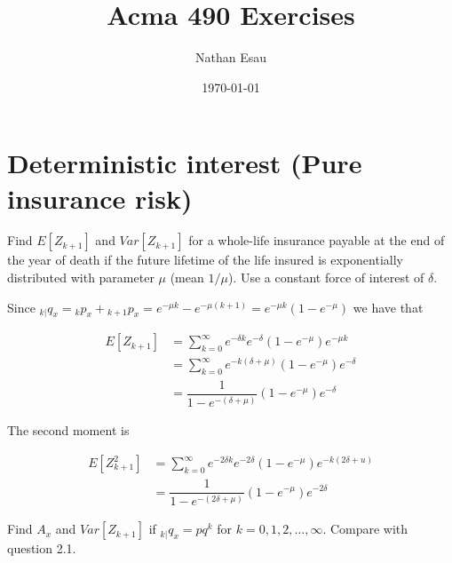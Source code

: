 \documentclass[12pt]{article}
\title{Acma 490 Exercises}
\author{Nathan Esau}
\date{\today}
\numberwithin{questioncounter}{section}
\begin{document}


\maketitle

\thispagestyle{empty}

\tableofcontents

\newpage

\setcounter{section}{1}
\section{Deterministic interest (Pure insurance risk)}

\begin{question}
Find $E[Z_{k+1}]$ and $Var[Z_{k+1}]$ for a whole-life insurance payable at the end of the year of death if the future lifetime of the life insured is exponentially distributed with parameter $\mu$ (mean $1/\mu$). Use a constant force of interest of $\delta$.
\end{question}

\begin{solution}
Since ${}_{k|}q_{x} = {}_{k}p_{x} + {}_{k+1}p_{x} = e^{-\mu k} - e^{-\mu(k+1)} = e^{-\mu k} (1 - e^{-\mu})$ we have that

\begin{align*}
E[Z_{k+1}] &= \sum_{k=0}^{\infty} e^{-\delta k} e^{-\delta} (1 - e^{-\mu}) e^{-\mu k} \\
&= \sum_{k=0}^{\infty} e^{-k(\delta + \mu)} (1 - e^{-\mu}) e^{-\delta} \\
&= \dfrac{1}{1 - e^{-(\delta + \mu)}} (1 - e^{-\mu}) e^{-\delta}
\end{align*}

The second moment is

\begin{align*}
E[Z_{k+1}^{2}] &= \sum_{k=0}^{\infty} e^{-2\delta k} e^{-2\delta} (1 - e^{-\mu}) e^{-k(2\delta + u)} \\
&= \dfrac{1}{1 - e^{-(2\delta + \mu)}} (1 - e^{-\mu}) e^{-2\delta}
\end{align*}

\end{solution}

\begin{question}
Find $A_{x}$ and $Var[Z_{k+1}]$ if ${}_{k|}q_{x}= pq^{k}$ for $k = 0, 1, 2, \dots, \infty$. Compare with question 2.1.
\end{question}
\end{document}
